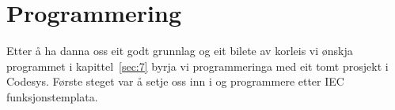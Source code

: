 \chapter{Programmering}
\thispagestyle{fancy}
Etter å ha danna oss eit godt grunnlag og eit bilete av korleis vi ønskja programmet i kapittel~\ref{sec:7} 
byrja vi programmeringa med eit tomt prosjekt i \gls{Codesys}. Første steget var å 
setje oss inn i og programmere etter \gls{IEC} funksjonstemplata.


